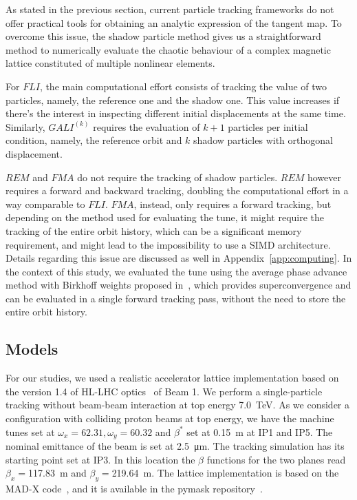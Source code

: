 As stated in the previous section, current particle tracking frameworks do not offer practical tools for obtaining an analytic expression of the tangent map. To overcome this issue, the shadow particle method gives us a straightforward method to numerically evaluate the chaotic behaviour of a complex magnetic lattice constituted of multiple nonlinear elements.

For $FLI$, the main computational effort consists of tracking the value of two particles, namely, the reference one and the shadow one. This value increases if there's the interest in inspecting different initial displacements at the same time. Similarly, $GALI^{(k)}$ requires the evaluation of $k+1$ particles per initial condition, namely, the reference orbit and $k$ shadow particles with orthogonal displacement.

$REM$ and $FMA$ do not require the tracking of shadow particles. $REM$ however requires a forward and backward tracking, doubling the computational effort in a way comparable to $FLI$. $FMA$, instead, only requires a forward tracking, but depending on the method used for evaluating the tune, it might require the tracking of the entire orbit history, which can be a significant memory requirement, and might lead to the impossibility to use a SIMD architecture. Details regarding this issue are discussed as well in Appendix~\ref{app:computing}. In the context of this study, we evaluated the tune using the average phase advance method with Birkhoff weights proposed in~\cite{russo:ipac2021-thpab189}, which provides superconvergence and can be evaluated in a single forward tracking pass, without the need to store the entire orbit history.

\subsection{Models} \label{sec:model}
%
For our studies, we used a realistic accelerator lattice implementation based on the version 1.4 of HL-LHC optics~\cite{Maria_2019} of Beam 1. We perform a single-particle tracking without beam-beam interaction at top energy \SI{7.0}{TeV}. As we consider a configuration with colliding proton beams at top energy, we have the machine tunes set at $\omega_x=62.31, \omega_y=60.32$ and $\beta^\ast$ set at \SI{0.15}{\meter} at IP1 and IP5. The nominal emittance of the beam is set at \SI{2.5}{\micro \meter}. The tracking simulation has its starting point set at IP3. In this location the $\beta$ functions for the two planes read $\beta_x=$\SI{117.83}{\meter} and $\beta_y=$\SI{219.64}{\meter}. The lattice implementation is based on the MAD-X code~\cite{madx}, and it is available in the pymask repository~\cite{pymask}.

